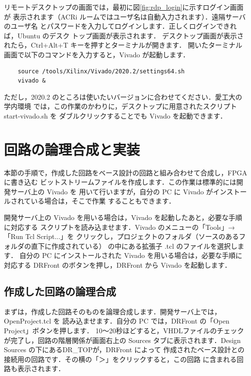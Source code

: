 リモートデスクトップの画面では，最初に図\ref{fig:rdp_login}に示すログイン画面が
表示されます（ACRi ルームではユーザ名は自動入力されます）．遠隔サーバのユーザ名
とパスワードを入力してログインします．正しくログインできれば，Ubuntu のデスク
トップ画面が表示されます．
デスクトップ画面が表示されたら，Ctrl+Alt+T キーを押すとターミナルが開きます．
開いたターミナル画面で以下のコマンドを入力すると，Vivado が起動します．
\begin{verbatim}
    source /tools/Xilinx/Vivado/2020.2/settings64.sh
    vivado &
\end{verbatim}
ただし，2020.2 のところは使いたいバージョンに合わせてください．愛工大の学内環境
では，この作業のかわりに，デスクトップに用意されたスクリプト start-vivado.sh を
ダブルクリックすることでも Vivado を起動できます．

\section{回路の論理合成と実装}

本節の手順で，作成した回路をベース設計の回路と組み合わせて合成し，FPGA に書き込む
ビットストリームファイルを作成します．この作業は標準的には開発サーバ上の Vivado を
用いて行いますが，自分の PC に Vivado がインストールされている場合は，そこで作業
することもできます．

開発サーバ上の Vivado を用いる場合は，Vivado を起動したあと，必要な手順に対応する
スクリプトを読み込ませます．Vivado のメニューの「Tools」→「Run Tcl Script...」を
クリックし，プロジェクトのフォルダ（ソースのあるフォルダの直下に作成されている）
の中にある拡張子 .tcl のファイルを選択します．
自分の PC にインストールされた Vivado を用いる場合は，必要な手順に対応する DRFront
のボタンを押し，DRFront から Vivado を起動します．

\subsection{作成した回路の論理合成}

まずは，作成した回路そのものを論理合成します．開発サーバ上では，OpenProject.tcl を
読み込ませます．自分の PC では，DRFront の「Open Project」ボタンを押します．
10～20秒ほどすると，VHDLファイルのチェックが完了し，回路の階層関係が画面右上の
Sources タブに表示されます．Design Sources の下にあるDR\_TOPが，DRFront によって
作成されたベース設計との接続用の回路です．その横の「＞」をクリックすると，この回路
に含まれる回路も表示されます．


